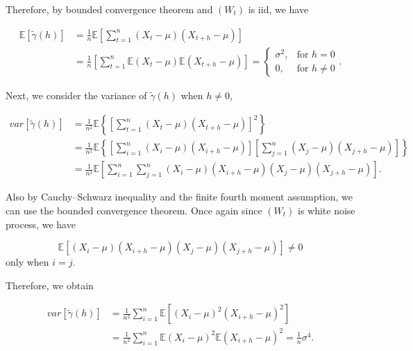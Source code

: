 \documentclass[]{book}
\theoremstyle{definition}
\theoremstyle{definition}
\theoremstyle{definition}
\theoremstyle{remark}
\begin{document}
Therefore, by bounded convergence theorem and \((W_t)\) is iid, we have

\[\begin{aligned}
    \mathbb{E}[\tilde{\gamma} \left( h \right)] &= \frac{1}{n}\mathbb{E}\left[\sum\limits_{t = 1}^{n} {\left( {{X_t} - \mu} \right)\left( {{X_{t + h}} - \mu} \right)}\right]\\
    &= \frac{1}{n}\left[\sum\limits_{t = 1}^{n} { \mathbb{E}\left( {{X_t} - \mu} \right)\mathbb{E}\left( {{X_{t + h}} - \mu} \right)}\right] =
    \begin{cases}
        \sigma^2, & \text{for } h = 0\\
        0, & \text{for } h \neq 0
    \end{cases}.
    \end{aligned}
\]

Next, we consider the variance of \(\tilde{\gamma} \left( h \right)\)
when \(h \neq 0\),

\[
\begin{aligned}
        var[\tilde{\gamma} \left( h \right)] &= \frac{1}{n^2}\mathbb{E}\left\{\left[\sum\limits_{t = 1}^{n} {\left( {{X_t} - \mu} \right)\left( {{X_{t + h}} - \mu} \right)}\right]^2\right\}\\
        &= \frac{1}{n^2}\mathbb{E}\left\{\left[\sum\limits_{i = 1}^{n} {\left( {{X_i} - \mu} \right)\left( {{X_{i + h}} - \mu} \right)}\right] \left[\sum\limits_{j = 1}^{n} {\left( {{X_j} - \mu} \right)\left( {{X_{j + h}} - \mu} \right)}\right]\right\}\\
        &= \frac{1}{n^2}\mathbb{E}\left[\sum\limits_{i = 1}^{n}\sum\limits_{j = 1}^{n} {\left( {{X_i} - \mu} \right)\left( {{X_{i + h}} - \mu} \right)}{\left( {{X_j} - \mu} \right)\left( {{X_{j + h}} - \mu} \right)}\right].
    \end{aligned}
\]

Also by Cauchy--Schwarz inequality and the finite fourth moment
assumption, we can use the bounded convergence theorem. Once again since
\((W_t)\) is white noise process, we have

\[
\mathbb{E}\left[{\left( {{X_i} - \mu} \right)\left( {{X_{i + h}} - \mu} \right)}{\left( {{X_j} - \mu} \right)\left( {{X_{j + h}} - \mu} \right)}\right] \neq 0
\] only when \(i = j\).

Therefore, we obtain

\[\begin{aligned}
        var[\tilde{\gamma} \left( h \right)] &= \frac{1}{n^2}\sum\limits_{i = 1}^{n} \mathbb{E}\left[ {\left( {{X_i} - \mu} \right)^2\left( {{X_{i + h}} - \mu} \right)^2}\right]\\
        &= \frac{1}{n^2}\sum\limits_{i = 1}^{n} \mathbb{E}{\left( {{X_i} - \mu} \right)^2\mathbb{E}\left( {{X_{i + h}} - \mu} \right)^2}
        = \frac{1}{n}\sigma^4.
    \end{aligned}
\]
\end{document}
